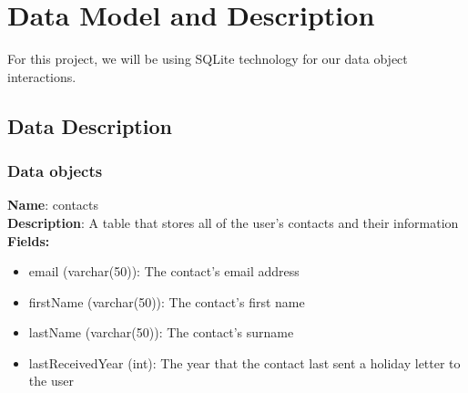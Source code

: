 \documentclass{article}
\begin{document}

\section{Data Model and Description}
For this project, we will be using SQLite technology for our data object interactions.

\subsection{Data Description}

\subsubsection{Data objects}
\textbf{Name}: contacts \\
\textbf{Description}: A table that stores all of the user's contacts and their information \\
\textbf{Fields:}
\begin{itemize}
\item email (varchar(50)): The contact's email address
\item firstName (varchar(50)): The contact's first name
\item lastName (varchar(50)): The contact's surname
\item lastReceivedYear (int): The year that the contact last sent a holiday letter to the user
\end{itemize}

\end{document}
